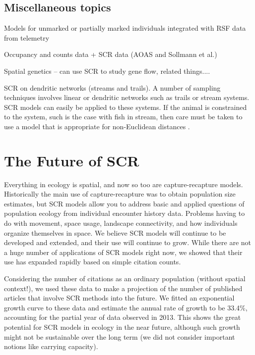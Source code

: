 \subsection{Miscellaneous topics}

Models for unmarked or partially marked individuals integrated with RSF data from telemetry

Occupancy and counts data + SCR data (AOAS and Sollmann et al.)

Spatial genetics -- can use SCR to study gene flow, related things....

SCR on dendritic networks (streams and trails).
A number of sampling techniques involves linear or dendritic networks such as
trails or stream systems.  SCR models can easily be applied to these systems.  
If the animal is constrained to the system, such is the case with fish in stream,
then care must be taken to use a model that is appropriate for non-Euclidean distances
\citep{peterson_etal:2013}. 


\section{The Future of SCR}

Everything in ecology is spatial, and now so too are capture-recapture
models. 
Historically the main use of capture-recapture was to obtain population
size estimates, but
SCR models allow you to address basic and applied questions of
population ecology from individual encounter history data. Problems
having to do with movement, space usage, landscape connectivity, and
how individuals organize themselves in space.
We believe SCR models will continue to be developed and
extended, and their use will continue to grow. While there are not
a huge number of applications of SCR models right now, we showed that
their use has expanded rapidly based on simple citation counts. 

Considering the number of citations as an ordinary population (without
spatial context!), we used these data to make a projection of the
number of published articles that involve SCR methods into the future.
We fitted an exponential growth curve to these data and estimate the
annual rate of growth to be 33.4\%, accounting for the partial year of
data observed in 2013.  This shows the great potential for SCR models in 
ecology in the near future, although such growth might not be sustainable
over the long term (we did not 
consider important notions like carrying capacity).


